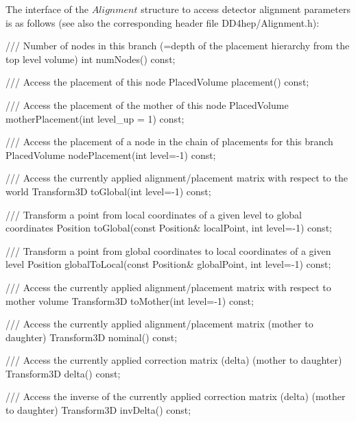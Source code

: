 \documentclass[10pt,a4paper]{article}
\begin{document}
\noindent
The interface of the $Alignment$ structure to access detector 
alignment parameters is as follows (see also the corresponding header file DD4hep/Alignment.h):
\begin{code}
      /// Number of nodes in this branch (=depth of the placement hierarchy from the top level volume)
      int numNodes() const;
      
      /// Access the placement of this node
      PlacedVolume placement()   const;

      /// Access the placement of the mother of this node
      PlacedVolume motherPlacement(int level_up = 1)   const;

      /// Access the placement of a node in the chain of placements for this branch
      PlacedVolume nodePlacement(int level=-1)   const;

      /// Access the currently applied alignment/placement matrix with respect to the world
      Transform3D toGlobal(int level=-1) const;

      /// Transform a point from local coordinates of a given level to global coordinates
      Position toGlobal(const Position& localPoint, int level=-1) const;

      /// Transform a point from global coordinates to local coordinates of a given level
      Position globalToLocal(const Position& globalPoint, int level=-1) const;

      /// Access the currently applied alignment/placement matrix with respect to mother volume
      Transform3D toMother(int level=-1) const;

      /// Access the currently applied alignment/placement matrix (mother to daughter)
      Transform3D nominal() const;

      /// Access the currently applied correction matrix (delta) (mother to daughter)
      Transform3D delta() const;

      /// Access the inverse of the currently applied correction matrix (delta) (mother to daughter)
      Transform3D invDelta() const;
\end{code}
\end{document}
